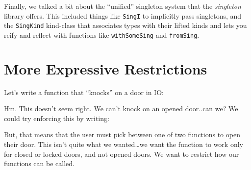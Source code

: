 \documentclass[]{article}
\newenvironment{Shaded}{}{}
\newcommand{\DataTypeTok}[1]{\textcolor[rgb]{0.56,0.13,0.00}{#1}}
\newcommand{\FunctionTok}[1]{\textcolor[rgb]{0.02,0.16,0.49}{#1}}
\newcommand{\NormalTok}[1]{#1}
\newcommand{\OtherTok}[1]{\textcolor[rgb]{0.00,0.44,0.13}{#1}}
\newcommand{\StringTok}[1]{\textcolor[rgb]{0.25,0.44,0.63}{#1}}
\begin{document}
Finally, we talked a bit about the ``unified'' singleton system that the
\emph{singleton} library offers. This included things like \texttt{SingI} to
implicitly pass singletons, and the \texttt{SingKind} kind-class that associates
types with their lifted kinds and lets you reify and reflect with functions like
\texttt{withSomeSing} and \texttt{fromSing}.

\hypertarget{more-expressive-restrictions}{%
\section{More Expressive Restrictions}\label{more-expressive-restrictions}}

Let's write a function that ``knocks'' on a door in IO:

\begin{Shaded}
\end{Shaded}

Hm. This doesn't seem right. We can't knock on an opened door..can we? We could
try enforcing this by writing:

\begin{Shaded}
\end{Shaded}

But, that means that the user must pick between one of two functions to open
their door. This isn't quite what we wanted\ldots{}we want the function to work
only for closed or locked doors, and not opened doors. We want to restrict how
our functions can be called.
\end{document}

